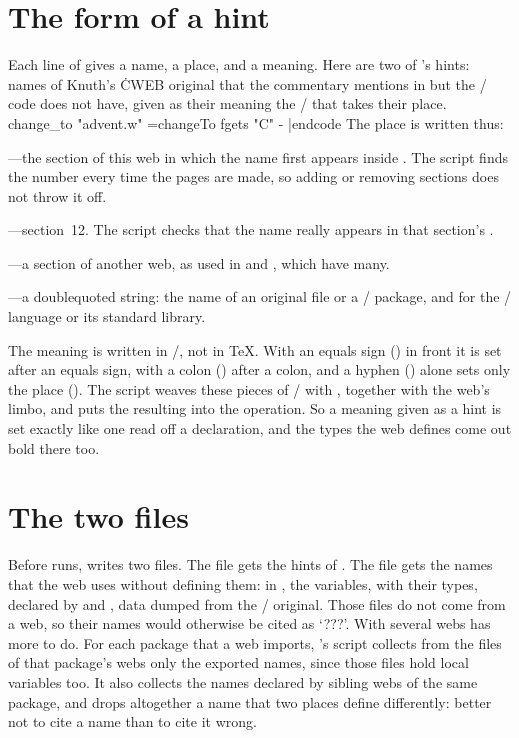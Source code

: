 \section{The form of a hint}
Each line of  gives a name, a place, and a meaning. Here are two
of 's hints: names of Knuth's \.{CWEB} original that the
commentary mentions in  but the \GO/ code does not have, given as
their meaning the \GO/ that takes their place.
\begincode
change_to "advent.w" =changeTo
fgets "C" -
|endcode
The place is written thus:

\bull \cw{\S}---the section of this web in which the name first appears inside
. The script finds the number every time the pages are made, so adding
or removing sections does not throw it off.

\bull {}---section~12. The script checks that the name really appears in
that section's .

\bull {}---a section of another web, as used in  and
, which have many.

\bull {}---a doublequoted string: the name of an original file or a
\GO/ package, and  for the \CEE/ language or its standard library.

\noindent The meaning is written in \GO/, not in \TeX. With an equals sign
(\cw{=}) in front it is set after an equals sign, with a colon (\cw{:}) after a
colon, and a hyphen (\cw{-}) alone sets only the place (). The script
weaves these pieces of \GO/ with , together with the web's limbo, and
puts the resulting  into the  operation. So a meaning
given as a hint is set exactly like one read off a declaration, and the types the
web defines come out bold there too.

\section{The two  files}
Before  runs,  writes two  files. The file
 gets the hints of . The file  gets
the names that the web uses without defining them: in , the
variables, with their types, declared by  and ,
data dumped from the \CEE/ original. Those files do not come from a web, so their
names would otherwise be cited as `???'. With several webs  has
more to do. For each package that a web imports, 's script collects
from the  files of that package's webs only the exported names, since
those files hold local variables too. It also collects the names declared by
sibling webs of the same package, and drops altogether a name that two places
define differently: better not to cite a name than to cite it wrong.

